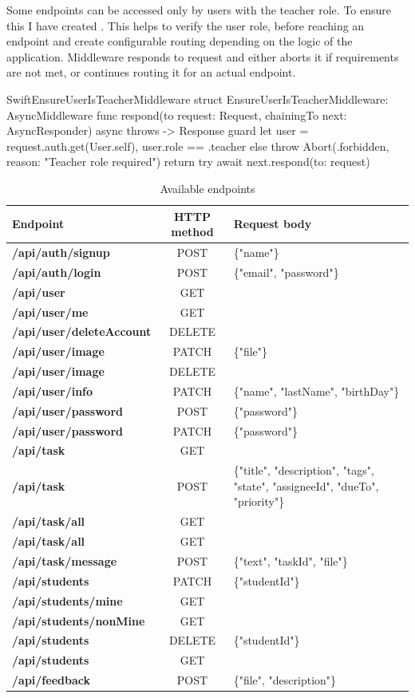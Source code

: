 \documentclass[
  biblatex = false,
  language=english,
  figures=false,
  sourcecodes,
  glossaries,
  index
]{kidiplom}
\begin{document}
Some endpoints can be accessed only by users with the teacher role. To ensure this I have created  . This helps to verify the user role, before reaching an endpoint and create configurable routing depending on the logic of the application. Middleware responds to request and either aborts it if requirements are not met, or continues routing it for an actual endpoint.

\FloatBarrier
\begin{kicode}{Swift}{}{EnsureUserIsTeacherMiddleware}
struct EnsureUserIsTeacherMiddleware: AsyncMiddleware {
    func respond(to request: Request, chainingTo next: AsyncResponder) async throws -> Response {
        guard let user = request.auth.get(User.self),
              user.role == .teacher else {
            throw Abort(.forbidden, reason: "Teacher role required")
        }
        return try await next.respond(to: request)
    }
}
\end{kicode}
\FloatBarrier

\begin{center}
\begin{longtable}{>{\bfseries}l >{\ttfamily}c L{8cm}}
\caption{Available endpoints}\\{\normalfont Endpoint} & {\normalfont HTTP method} & {\normalfont Request body}\\
\hline
/api/auth/signup & POST & \{"name"\} \\
/api/auth/login & POST & \{"email", "password"\} \\
/api/user & GET & \\
/api/user/me & GET & \\
/api/user/deleteAccount & DELETE & \\
/api/user/image & PATCH & \{"file"\} \\
/api/user/image & DELETE & \\
/api/user/info & PATCH & \{"name", "lastName", "birthDay"\} \\
/api/user/password & POST & \{"password"\} \\
/api/user/password & PATCH & \{"password"\} \\
/api/task & GET & \\
/api/task & POST & \{"title", "description", "tags", "state", "assigneeId", "dueTo", "priority"\} \\
/api/task/all & GET & \\
/api/task/all & GET & \\
/api/task/message & POST & \{"text", "taskId", "file"\} \\
/api/students & PATCH & \{"studentId"\} \\
/api/students/mine & GET & \\
/api/students/nonMine & GET & \\
/api/students & DELETE & \{"studentId"\} \\
/api/students & GET & \\
/api/feedback & POST & \{"file", "description"\}
\end{longtable}
\end{center}
\end{document}
